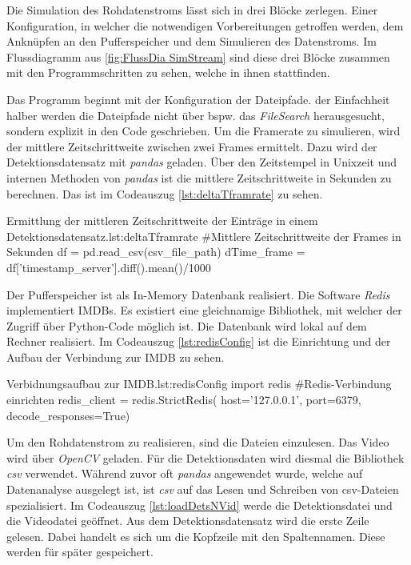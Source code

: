 Die Simulation des Rohdatenstroms lässt sich in drei Blöcke zerlegen. Einer Konfiguration, in welcher die notwendigen Vorbereitungen getroffen werden, dem Anknüpfen an den Pufferspeicher und dem Simulieren des Datenstroms. Im Flussdiagramm aus \autoref{fig:FlussDia SimStream} sind diese drei Blöcke zusammen mit den Programmschritten zu sehen, welche in ihnen stattfinden. \par


Das Programm beginnt mit der Konfiguration der Dateipfade. der Einfachheit halber werden die Dateipfade nicht über bspw. das \textit{FileSearch} herausgesucht, sondern explizit in den Code geschrieben. Um die Framerate zu simulieren, wird der mittlere Zeitschrittweite zwischen zwei Frames ermittelt. Dazu wird der Detektionsdatensatz mit \textit{pandas} geladen. Über den Zeitstempel in Unixzeit und internen Methoden von \textit{pandas} ist die mittlere Zeitschrittweite in Sekunden zu berechnen. Das ist im Codeauszug \ref{lst:deltaTframrate} zu sehen.

\begin{pythoncode}{Ermittlung der mittleren Zeitschrittweite der Einträge in einem Detektionsdatensatz.}{lst:deltaTframrate}
#Mittlere Zeitschrittweite der Frames in Sekunden 
df = pd.read_csv(csv_file_path)
dTime_frame = df['timestamp_server'].diff().mean()/1000
\end{pythoncode}

Der Pufferspeicher ist als In-Memory Datenbank realisiert. Die Software \textit{Redis} implementiert IMDBs. Es existiert eine gleichnamige Bibliothek, mit welcher der Zugriff über Python-Code möglich ist. Die Datenbank wird lokal auf dem Rechner realisiert. Im Codeauszug \ref{lst:redisConfig} ist die Einrichtung und der Aufbau der Verbindung zur IMDB zu sehen.

\begin{pythoncode}{Verbidnungsaufbau zur IMDB.}{lst:redisConfig}
import redis
#Redis-Verbindung einrichten
redis_client = redis.StrictRedis(
                    host='127.0.0.1',
                    port=6379,
                    decode_responses=True)
\end{pythoncode}

Um den Rohdatenstrom zu realisieren, sind die Dateien einzulesen. Das Video wird über \textit{OpenCV} geladen. Für die Detektionsdaten wird diesmal die Bibliothek \textit{csv} verwendet. Während zuvor oft \textit{pandas} angewendet wurde, welche auf Datenanalyse ausgelegt ist, ist \textit{csv} auf das Lesen und Schreiben von csv-Dateien spezialisiert. Im Codeauszug \ref{lst:loadDetsNVid} werde die Detektionsdatei und die Videodatei geöffnet. Aus dem Detektionsdatensatz wird die erste Zeile gelesen. Dabei handelt es sich um die Kopfzeile mit den Spaltennamen. Diese werden für später gespeichert. 

